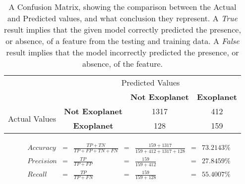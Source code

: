 
    \renewcommand{\arraystretch}{2}
    \renewcommand{\tabcolsep}{20.25pt}
    \begin{table}[ht]
    \begin{tabular}{cccc}
     & \multicolumn{3}{c}{Predicted Values} \\ \cline{3-4}
     & \multicolumn{1}{c|}{} & \multicolumn{1}{c|}{\textbf{Not Exoplanet}} & \multicolumn{1}{c|}{\textbf{Exoplanet}} \\ \cline{2-4}
    \multicolumn{1}{c|}{\multirow{2}{2.0cm}{Actual Values}} & \multicolumn{1}{c|}{\textbf{Not Exoplanet}} & \multicolumn{1}{c|}{1317} & \multicolumn{1}{c|}{412} \\ \cline{2-4}
    \multicolumn{1}{c|}{} & \multicolumn{1}{c|}{\textbf{Exoplanet}} & \multicolumn{1}{c|}{128} & \multicolumn{1}{c|}{159} \\ \cline{2-4}
    \end{tabular}
    \caption{A Confusion Matrix, showing the comparison between the Actual and Predicted values, and what conclusion they represent. A \emph{True} result implies that the given model correctly predicted the presence, or absence, of a feature from the testing and training data. A \emph{False} result implies that the model incorrectly predicted the presence, or absence, of the feature.}
    \label{tab:sklearn-KNNconfusionmatrix}
    \end{table}

    \label{eq:precisionsklearn-KNN}
    \begin{align*}
        Accuracy &= &\frac{TP + TN}{TP + FP + TN + FN} &= &\frac{159 + 1317}{159 + 412 + 1317 + 128} &= & 73.2143\% \\
        Precision &= &\frac{TP}{TP + FP} &= &\frac{159}{159 + 412} &= & 27.8459\% \\
        Recall &= &\frac{TP}{TP + FN} &= &\frac{159}{159 + 128} &= & 55.4007\% \\
    \end{align*}

    \renewcommand{\arraystretch}{1}
    \renewcommand{\tabcolsep}{5.25pt}
    
